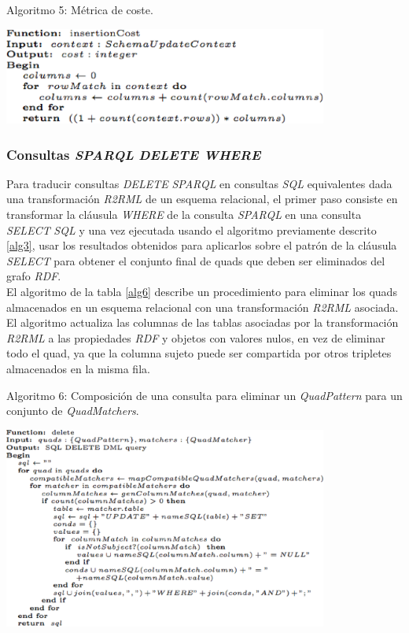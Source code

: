 \begin{table}
\vspace{2.4in}
\caption{Algoritmo 5: M\'etrica de coste.}
\includegraphics[width=0.8\textwidth]{algoritmo5}
\label{alg5}
\end{table}


\subsubsection{Consultas \textit{SPARQL} \textit{DELETE WHERE}}

Para traducir consultas \textit{DELETE} \textit{SPARQL} en consultas \textit{SQL} equivalentes dada una transformaci\'on \textit{R2RML} de un esquema relacional, el primer paso consiste en transformar la cl\'ausula \textit{WHERE} de la consulta \textit{SPARQL} en una consulta \textit{SELECT} \textit{SQL} y una vez ejecutada usando el algoritmo previamente descrito \ref{alg3}, usar los resultados obtenidos para aplicarlos sobre el patr\'on de la cl\'ausula \textit{SELECT} para obtener el conjunto final de quads que deben ser eliminados del grafo \textit{RDF}.\\
El algoritmo de la tabla \ref{alg6} describe un procedimiento para eliminar los quads almacenados en un esquema relacional con una transformaci\'on \textit{R2RML} asociada. El algoritmo actualiza las columnas de las tablas asociadas por la transformaci\'on \textit{R2RML} a las propiedades \textit{RDF} y objetos con valores nulos, en vez de eliminar todo el quad, ya que la columna sujeto puede ser compartida por otros tripletes almacenados en la misma fila.\\

\begin{table}
\vspace{2.4in}
\caption{Algoritmo 6: Composici\'on de una consulta para eliminar un \textit{QuadPattern} para un conjunto de \textit{QuadMatchers}.}
\includegraphics[width=0.8\textwidth]{algoritmo6}
\label{alg6}
\end{table}


